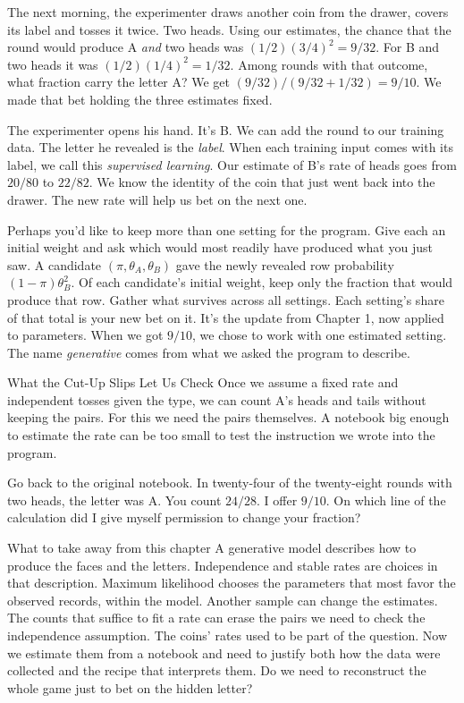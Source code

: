 The next morning, the experimenter draws another coin from the drawer, covers its label and tosses it twice. Two heads. Using our estimates, the chance that the round would produce A \emph{and} two heads was $(1/2)(3/4)^2=9/32$. For B and two heads it was $(1/2)(1/4)^2=1/32$. Among rounds with that outcome, what fraction carry the letter A? We get $(9/32)/(9/32+1/32)=9/10$. We made that bet holding the three estimates fixed.

The experimenter opens his hand. It's B. We can add the round to our training data. The letter he revealed is the \emph{label}. When each training input comes with its label, we call this \emph{supervised learning}. Our estimate of B's rate of heads goes from $20/80$ to $22/82$. We know the identity of the coin that just went back into the drawer. The new rate will help us bet on the next one.

Perhaps you'd like to keep more than one setting for the program. Give each an initial weight and ask which would most readily have produced what you just saw. A candidate $(\pi,\theta_A,\theta_B)$ gave the newly revealed row probability $(1-\pi)\theta_B^2$. Of each candidate's initial weight, keep only the fraction that would produce that row. Gather what survives across all settings. Each setting's share of that total is your new bet on it. It's the update from Chapter 1, now applied to parameters. When we got $9/10$, we chose to work with one estimated setting. The name \emph{generative} comes from what we asked the program to describe.

\begin{quadro}{What the Cut-Up Slips Let Us Check}
 Once we assume a fixed rate and independent tosses given the type, we can count A's heads and tails without keeping the pairs.
 For this we need the pairs themselves. A notebook big enough to estimate the rate can be too small to test the instruction we wrote into the program.
\end{quadro}

Go back to the original notebook. In twenty-four of the twenty-eight rounds with two heads, the letter was A. You count $24/28$. I offer $9/10$. On which line of the calculation did I give myself permission to change your fraction?

\begin{quadro}{What to take away from this chapter}
 A generative model describes how to produce the faces and the letters. Independence and stable rates are choices in that description.
 Maximum likelihood chooses the parameters that most favor the observed records, within the model. Another sample can change the estimates.
 The counts that suffice to fit a rate can erase the pairs we need to check the independence assumption.
 The coins' rates used to be part of the question. Now we estimate them from a notebook and need to justify both how the data were collected and the recipe that interprets them.
 Do we need to reconstruct the whole game just to bet on the hidden letter?
\end{quadro}
